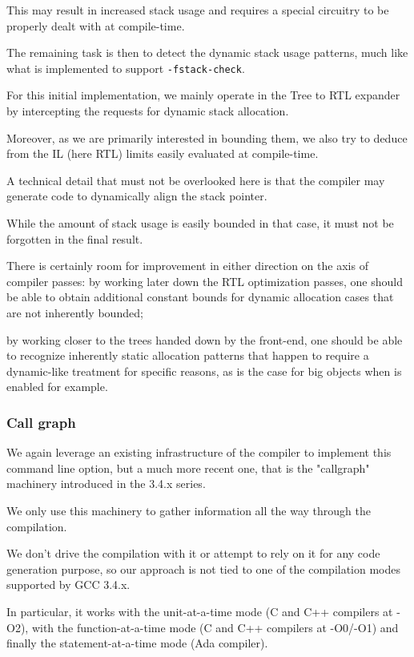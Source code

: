 This may result in increased stack usage and requires a special circuitry
to be properly dealt with at compile-time.

The remaining task is then to detect the dynamic stack usage patterns, much
like what is implemented to support {\tt -fstack-check}.

For this initial implementation, we mainly operate in the Tree to RTL expander
by intercepting the requests for dynamic stack allocation.

Moreover, as we are primarily interested in bounding them, we also try to
deduce from the IL (here RTL) limits easily evaluated at compile-time.

A technical detail that must not be overlooked here is that the compiler
may generate code to dynamically align the stack pointer.

While the amount of stack usage is easily bounded in that case, it must not be
forgotten in the final result.

There is certainly room for improvement in either direction on the axis of
compiler passes: by working later down the RTL optimization passes, one
should be able to obtain additional constant bounds for dynamic allocation
cases that are not inherently bounded;

by working closer to the trees handed down by the front-end, one should be
able to recognize inherently static allocation patterns that happen to require
a dynamic-like treatment for specific reasons, as is the case for big objects
when  is enabled for example.

\subsubsection{Call graph}

We again leverage an existing infrastructure of the compiler to implement
this command line option, but a much more recent one, that is the "callgraph"
machinery introduced in the 3.4.x series.

We only use this machinery to gather information all the way through the
compilation.

We don't drive the compilation with it or attempt to rely on it for any code
generation purpose, so our approach is not tied to one of the compilation
modes supported by GCC 3.4.x.

In particular, it works with the unit-at-a-time mode (C and C++ compilers at
-O2), with the function-at-a-time mode (C and C++ compilers at -O0/-O1) and
finally the statement-at-a-time mode (Ada compiler).

